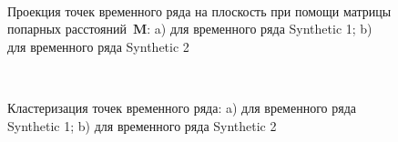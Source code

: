 \begin{figure}[h!t]\center
{}
\\
\caption{Проекция точек временного ряда на плоскость при помощи матрицы попарных расстояний~$\textbf{M}$: a) для временного ряда Synthetic 1; b) для временного ряда Synthetic 2}
\label{fig_synthetic_2D}
\end{figure}

\begin{figure}[h!t]\center
{}
\\
\caption{Кластеризация точек временного ряда: a) для временного ряда Synthetic 1; b) для временного ряда Synthetic 2}
\label{fig_synthetic_claster}
\end{figure}


